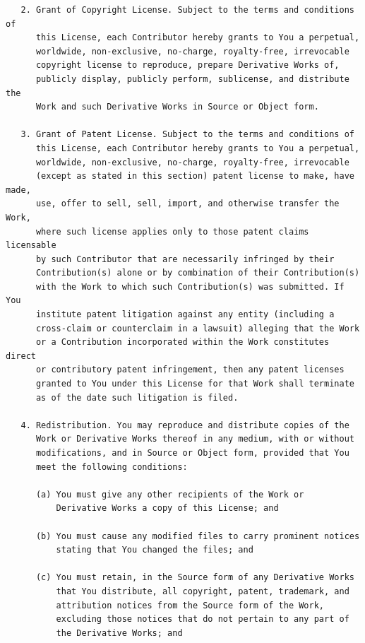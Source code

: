 \begin{dirlistbrief}
\begin{verbatim}
   2. Grant of Copyright License. Subject to the terms and conditions of
      this License, each Contributor hereby grants to You a perpetual,
      worldwide, non-exclusive, no-charge, royalty-free, irrevocable
      copyright license to reproduce, prepare Derivative Works of,
      publicly display, publicly perform, sublicense, and distribute the
      Work and such Derivative Works in Source or Object form.

   3. Grant of Patent License. Subject to the terms and conditions of
      this License, each Contributor hereby grants to You a perpetual,
      worldwide, non-exclusive, no-charge, royalty-free, irrevocable
      (except as stated in this section) patent license to make, have made,
      use, offer to sell, sell, import, and otherwise transfer the Work,
      where such license applies only to those patent claims licensable
      by such Contributor that are necessarily infringed by their
      Contribution(s) alone or by combination of their Contribution(s)
      with the Work to which such Contribution(s) was submitted. If You
      institute patent litigation against any entity (including a
      cross-claim or counterclaim in a lawsuit) alleging that the Work
      or a Contribution incorporated within the Work constitutes direct
      or contributory patent infringement, then any patent licenses
      granted to You under this License for that Work shall terminate
      as of the date such litigation is filed.

   4. Redistribution. You may reproduce and distribute copies of the
      Work or Derivative Works thereof in any medium, with or without
      modifications, and in Source or Object form, provided that You
      meet the following conditions:

      (a) You must give any other recipients of the Work or
          Derivative Works a copy of this License; and

      (b) You must cause any modified files to carry prominent notices
          stating that You changed the files; and

      (c) You must retain, in the Source form of any Derivative Works
          that You distribute, all copyright, patent, trademark, and
          attribution notices from the Source form of the Work,
          excluding those notices that do not pertain to any part of
          the Derivative Works; and


\end{verbatim}
\end{dirlistbrief}
